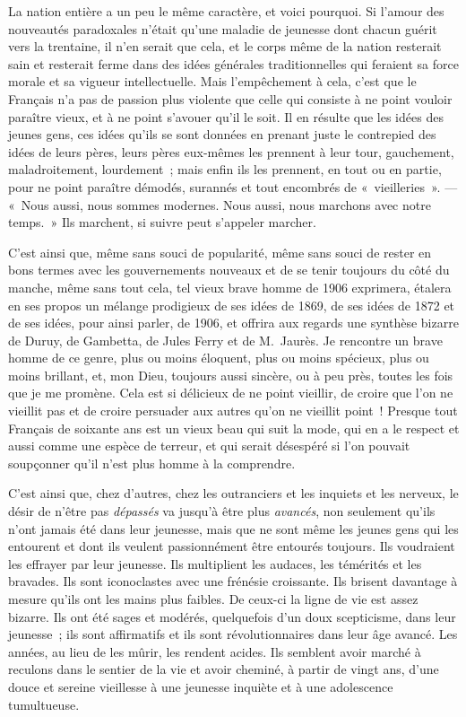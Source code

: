 \documentclass[french,twoside]{book} %
\begin{document}
La nation entière a un peu le même caractère, et voici pourquoi. Si l’amour des nouveautés paradoxales n’était qu’une maladie de jeunesse dont chacun guérit vers la trentaine, il n’en serait que cela, et le corps même de la nation resterait sain et resterait ferme dans des idées générales traditionnelles qui feraient sa force morale et sa vigueur  intellectuelle. Mais l’empêchement à cela, c’est que le Français n’a pas de passion plus violente que celle qui consiste à ne point vouloir paraître vieux, et à ne point s’avouer qu’il le soit. Il en résulte que les idées des jeunes gens, ces idées qu’ils se sont données en prenant juste le contrepied des idées de leurs pères, leurs pères eux-mêmes les prennent à leur tour, gauchement, maladroitement, lourdement ; mais enfin ils les prennent, en tout ou en partie, pour ne point paraître démodés, surannés et tout encombrés de « vieilleries ». — « Nous aussi, nous sommes modernes. Nous aussi, nous marchons avec notre temps. » Ils marchent, si suivre peut s’appeler marcher.\par
C’est ainsi que, même sans souci de popularité, même sans souci de rester en bons termes avec les gouvernements nouveaux et de se tenir toujours du côté du manche, même sans tout cela, tel vieux brave homme de 1906 exprimera, étalera en ses propos un mélange prodigieux de ses idées de 1869, de ses idées de 1872 et de ses idées, pour ainsi parler, de 1906, et offrira aux regards une synthèse bizarre de Duruy, de Gambetta, de Jules Ferry et de M. Jaurès. Je rencontre un brave homme de ce genre, plus ou moins éloquent, plus ou moins spécieux, plus ou moins brillant, et, mon Dieu, toujours aussi sincère, ou à peu près, toutes les  fois que je me promène. Cela est si délicieux de ne point vieillir, de croire que l’on ne vieillit pas et de croire persuader aux autres qu’on ne vieillit point ! Presque tout Français de soixante ans est un vieux beau qui suit la mode, qui en a le respect et aussi comme une espèce de terreur, et qui serait désespéré si l’on pouvait soupçonner qu’il n’est plus homme à la comprendre.\par
C’est ainsi que, chez d’autres, chez les outranciers et les inquiets et les nerveux, le désir de n’être pas {\itshape dépassés} va jusqu’à être plus {\itshape avancés}, non seulement qu’ils n’ont jamais été dans leur jeunesse, mais que ne sont même les jeunes gens qui les entourent et dont ils veulent passionnément être entourés toujours. Ils voudraient les effrayer par leur jeunesse. Ils multiplient les audaces, les témérités et les bravades. Ils sont iconoclastes avec une frénésie croissante. Ils brisent davantage à mesure qu’ils ont les mains plus faibles. De ceux-ci la ligne de vie est assez bizarre. Ils ont été sages et modérés, quelquefois d’un doux scepticisme, dans leur jeunesse ; ils sont affirmatifs et ils sont révolutionnaires dans leur âge avancé. Les années, au lieu de les mûrir, les rendent acides. Ils semblent avoir marché à reculons dans le sentier de la vie et avoir cheminé, à partir de vingt ans, d’une douce et sereine vieillesse à une jeunesse  inquiète et à une adolescence tumultueuse.\par
\end{document}
